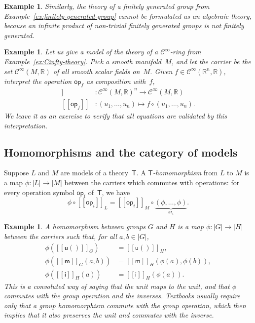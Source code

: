 \documentclass{amsart}
\newcommand{\RR}{\mathbb{R}} %
\newcommand{\theory}[1]{\mathsf{#1}} %
\newcommand{\op}[1]{\mathsf{op}_{#1}} %
\newcommand{\arity}[1]{\mathsf{ar}_{#1}} %
\newcommand{\Cinfty}{\mathcal{C}^\infty}
\newcommand{\sem}[1]{[\![#1]\!]} %
\newtheorem{example}[definition]{Example}
\begin{document}
\begin{example}
  Similarly, the theory of a finitely generated group from
  Example~\ref{ex:finitely-generated-group} cannot be formulated as an algebraic theory,
  because an infinite product of non-trivial finitely generated groups is not finitely
  generated.
\end{example}

\begin{example}
  Let us give a model of the theory of a $\Cinfty$-ring from
  Example~\ref{ex:Cinfty-theory}. Pick a smooth manifold~$M$, and let the carrier be the
  set $\Cinfty(M, \RR)$ of all smooth scalar fields on~$M$. Given
  $f \in \Cinfty(\RR^n, \RR)$, interpret the operation $\op{f}$ as composition with~$f$,
  \begin{align*}
    \sem{\op{f}} &: \Cinfty(M, \RR)^n \to \Cinfty(M, \RR) \\
    \sem{\op{f}} &: (u_1, \ldots, u_n) \mapsto f \circ (u_1, \ldots, u_n).
  \end{align*}
  We leave it as an exercise to verify that all equations are validated by this
  interpretation.
\end{example}

\subsection{Homomorphisms and the category of models}
\label{sec:homom-categ-models}

Suppose $L$ and $M$ are models of a theory~$\theory{T}$. A
\emph{$\theory{T}$-homomorphism} from $L$ to $M$ is a map $\phi : |L| \to |M|$ between the
carriers which commutes with operations: for every operation symbol $\op{i}$
of~$\theory{T}$, we have
%
\begin{equation*}
  \phi \circ \sem{\op{i}}_L = \sem{\op{i}}_M \circ \underbrace{(\phi, \ldots, \phi)}_{\arity{i}}.
\end{equation*}

\begin{example}
  A homomorphism between groups $G$ and $H$ is a map $\phi : |G| \to |H|$ between the
  carriers such that, for all $a, b \in |G|$,
  \begin{align*}
    \phi(\sem{\mathsf{u}()}_G) &= \sem{\mathsf{u}()}_H,\\
    \phi(\sem{\mathsf{m}}_G(a,b)) &= \sem{\mathsf{m}}_H(\phi(a), \phi(b)),\\
    \phi(\sem{\mathsf{i}}_H(a)) &= \sem{\mathsf{i}}_H(\phi(a)).
  \end{align*}
  This is a convoluted way of saying that the unit maps to the unit, and that $\phi$
  commutes with the group operation and the inverses. Textbooks usually require only that
  a group homomorphism commute with the group operation, which then implies that it also
  preserves the unit and commutes with the inverse.
\end{example}
\end{document}
